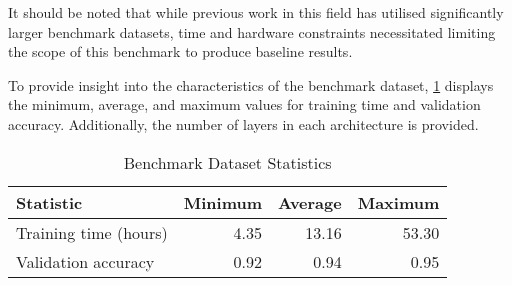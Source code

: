 It should be noted that while previous work in this field has utilised significantly larger benchmark datasets, time and hardware constraints necessitated limiting the scope of this benchmark to produce baseline results.

To provide insight into the characteristics of the benchmark dataset, \cref{tab:benchmark_stats} displays the minimum, average, and maximum values for training time and validation accuracy. Additionally, the number of layers in each architecture is provided.

\begin{table}[h]
    \centering
    \caption{Benchmark Dataset Statistics}
    \begin{tabular}{lrrr}
        \textbf{Statistic} & \textbf{Minimum} & \textbf{Average} & \textbf{Maximum} \\ \hline
        Training time (hours) & 4.35 & 13.16 & 53.30 \\
        \cellcolor{verylightgray}Validation accuracy & \cellcolor{verylightgray}0.92 & \cellcolor{verylightgray}0.94 & \cellcolor{verylightgray}0.95 \\
    \end{tabular}
    \label{tab:benchmark_stats}
\end{table}


